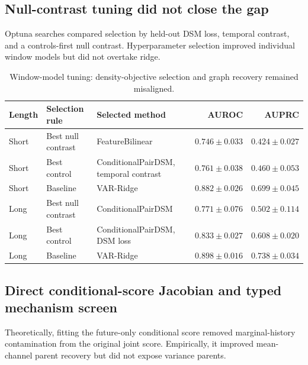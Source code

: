 \documentclass[10pt]{article}
\begin{document}
\subsection{Null-contrast tuning did not close the gap}

Optuna searches compared selection by held-out DSM loss, temporal contrast, and a controls-first null contrast. Hyperparameter selection improved individual window models but did not overtake ridge.

\begin{table}[H]
\centering\small
\begin{tabularx}{\linewidth}{L{1.2cm}L{3.0cm}Y rr}
\toprule
Length & Selection rule & Selected method & AUROC & AUPRC \\
\midrule
Short & Best null contrast & FeatureBilinear & $0.746\pm0.033$ & $0.424\pm0.027$ \\
Short & Best control & ConditionalPairDSM, temporal contrast & $0.761\pm0.038$ & $0.460\pm0.053$ \\
Short & Baseline & VAR-Ridge & $0.882\pm0.026$ & $0.699\pm0.045$ \\
Long & Best null contrast & ConditionalPairDSM & $0.771\pm0.076$ & $0.502\pm0.114$ \\
Long & Best control & ConditionalPairDSM, DSM loss & $0.833\pm0.027$ & $0.608\pm0.020$ \\
Long & Baseline & VAR-Ridge & $0.898\pm0.016$ & $0.738\pm0.034$ \\
\bottomrule
\end{tabularx}
\caption{Window-model tuning: density-objective selection and graph recovery remained misaligned.}
\end{table}

\subsection{Direct conditional-score Jacobian and typed mechanism screen}

Theoretically, fitting the future-only conditional score removed marginal-history contamination from the original joint score. Empirically, it improved mean-channel parent recovery but did not expose variance parents.
\end{document}

